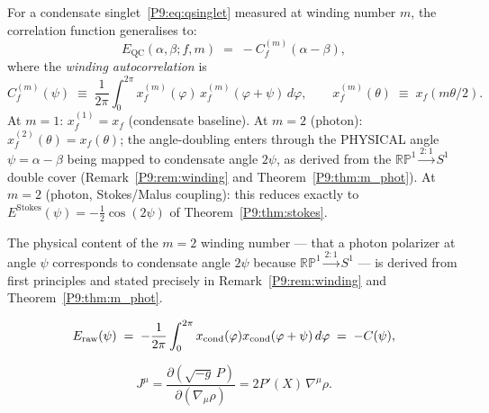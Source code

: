 \begin{remark}
\label{P9:rem:quantum_coherent}
For a condensate singlet~\eqref{P9:eq:qsinglet} measured at winding number $m$,
the correlation function generalises to:
\begin{equation}
  E_\mathrm{QC}(\alpha,\beta;f,m)
  \;=\; -C_f^{(m)}(\alpha-\beta),
  \label{P9:eq:E_QC}
\end{equation}
where the \emph{winding autocorrelation} is
\begin{equation}
  C_f^{(m)}(\psi)
  \;\equiv\; \frac{1}{2\pi}\int_0^{2\pi}
  x_f^{(m)}(\varphi)\,x_f^{(m)}(\varphi+\psi)\,d\varphi,
  \qquad
  x_f^{(m)}(\theta) \;\equiv\; x_f(m\theta/2).
  \label{P9:eq:C_winding}
\end{equation}
At $m=1$: $x_f^{(1)}=x_f$ (condensate baseline).
At $m=2$ (photon): $x_f^{(2)}(\theta)=x_f(\theta)$; the angle-doubling enters
through the PHYSICAL angle $\psi=\alpha-\beta$ being mapped to condensate angle $2\psi$,
as derived from the $\mathbb{RP}^1\xrightarrow{2:1}S^1$ double cover
(Remark~\ref{P9:rem:winding} and Theorem~\ref{P9:thm:m_phot}).
At $m=2$ (photon, Stokes/Malus coupling): this reduces exactly to
$E^\mathrm{Stokes}(\psi)=-\tfrac{1}{2}\cos(2\psi)$ of Theorem~\ref{P9:thm:stokes}.
\end{remark}

\begin{remark}
\label{P9:rem:angle_doubling_pointer}
The physical content of the $m=2$ winding number --- that a photon
polarizer at angle $\psi$ corresponds to condensate angle $2\psi$
because $\mathbb{RP}^1\xrightarrow{2:1}S^1$ --- is derived from first
principles and stated precisely in Remark~\ref{P9:rem:winding}
and Theorem~\ref{P9:thm:m_phot}.
\end{remark}

\begin{equation}
  E_\mathrm{raw}(\psi)
  \;=\; -\frac{1}{2\pi}\int_0^{2\pi} x_{\mathrm{cond}}(\varphi)x_{\mathrm{cond}}(\varphi+\psi)\,d\varphi
  \;=\; -C(\psi),
  \label{P9:eq:E_raw}
\end{equation}

\begin{equation}
  J^\mu
  = \frac{\partial(\sqrt{-g}\,P)}{\partial(\nabla_\mu\rho)}
  = 2P'(X)\,\nabla^\mu\rho.
  \label{P9:eq:J_Noether}
\end{equation}

